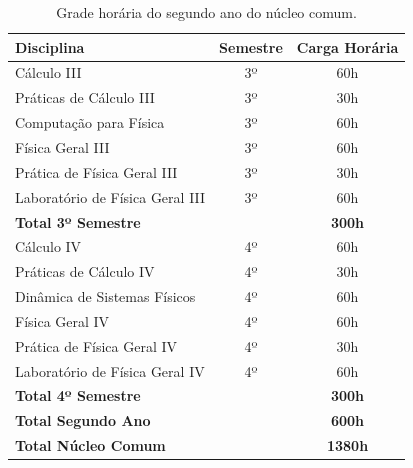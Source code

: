 \documentclass[a4paper, 12pt]{article}
\begin{document}
\begin{table}[h]
    \centering
    \begin{tabular}{|l|c|c|}
        \hline
        \textbf{Disciplina}             & \textbf{Semestre} & \textbf{Carga Horária} \\
        \hline
        Cálculo III                     & 3º                & 60h                    \\
        Práticas de Cálculo III         & 3º                & 30h                    \\
        Computação para Física          & 3º                & 60h                    \\
        Física Geral III                & 3º                & 60h                    \\
        Prática de Física Geral III     & 3º                & 30h                    \\
        Laboratório de Física Geral III & 3º                & 60h                    \\
        \hline
        \textbf{Total 3º Semestre}      &                   & \textbf{300h}          \\
        \hline
        \hline
        Cálculo IV                      & 4º                & 60h                    \\
        Práticas de Cálculo IV          & 4º                & 30h                    \\
        Dinâmica de Sistemas Físicos    & 4º                & 60h                    \\
        Física Geral IV                 & 4º                & 60h                    \\
        Prática de Física Geral IV      & 4º                & 30h                    \\
        Laboratório de Física Geral IV  & 4º                & 60h                    \\
        \hline
        \textbf{Total 4º Semestre}      &                   & \textbf{300h}          \\
        \hline
        \textbf{Total Segundo Ano}      &                   & \textbf{600h}          \\
        \hline
        \textbf{Total Núcleo Comum}     &                   & \textbf{1380h}         \\
        \hline
    \end{tabular}
    \caption{Grade horária do segundo ano do núcleo comum.}
\end{table}
\end{document}
